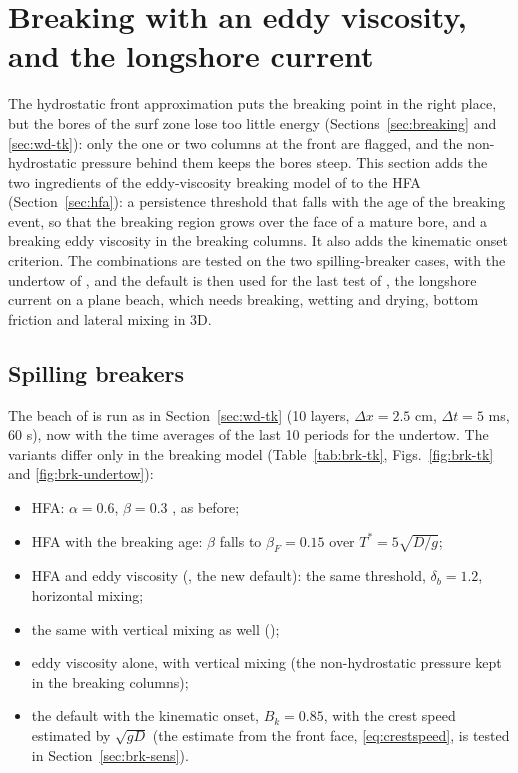 \FloatBarrier
\section{Breaking with an eddy viscosity, and the longshore current}
\label{sec:brk}

The hydrostatic front approximation puts the breaking point in the right
place, but the bores of the surf zone lose too little energy
(Sections~\ref{sec:breaking} and \ref{sec:wd-tk}): only the one or two
columns at the front are flagged, and the non-hydrostatic pressure behind
them keeps the bores steep. This section adds the two ingredients of the
eddy-viscosity breaking model of \citet{kennedy2000} to the HFA
(Section~\ref{sec:hfa}): a persistence threshold that falls with the age of
the breaking event, so that the breaking region grows over the face of a
mature bore, and a breaking eddy viscosity in the breaking columns. It also
adds the kinematic onset criterion. The combinations are tested on the two
spilling-breaker cases, with the undertow of \citet{ting1994}, and the
default is then used for the last test of \citet{ma2012}, the longshore
current on a plane beach, which needs breaking, wetting and drying, bottom
friction and lateral mixing in 3D.

\subsection{Spilling breakers}
\label{sec:brk-spill}

The beach of \citet{ting1994} is run as in Section~\ref{sec:wd-tk} (10
layers, $\Delta x = 2.5$ cm, $\Delta t = 5$ ms, 60 s), now with the time
averages of the last 10 periods for the undertow. The variants differ only in
the breaking model (Table~\ref{tab:brk-tk}, Figs.~\ref{fig:brk-tk} and
\ref{fig:brk-undertow}):
\begin{itemize}[nosep]
  \item HFA: $\alpha = 0.6$, $\beta = 0.3$ \citep{smit2013}, as before;
  \item HFA with the breaking age: $\beta$ falls to $\beta_F = 0.15$ over
        $T^* = 5\sqrt{D/g}$;
  \item HFA and eddy viscosity (, the new default): the same
        threshold, $\delta_b = 1.2$, horizontal mixing;
  \item the same with vertical mixing as well ();
  \item eddy viscosity alone, with vertical mixing (the non-hydrostatic
        pressure kept in the breaking columns);
  \item the default with the kinematic onset, $B_k = 0.85$, with the crest
        speed estimated by $\sqrt{gD}$ (the estimate from the front face,
        \eqref{eq:crestspeed}, is tested in Section~\ref{sec:brk-sens}).
\end{itemize}

